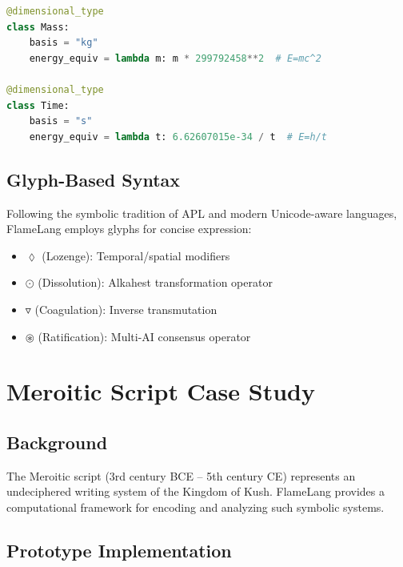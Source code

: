 \documentclass[11pt,a4paper]{article}
\begin{document}
\begin{lstlisting}[language=Python, caption=Dimensional Type Declaration]
@dimensional_type
class Mass:
    basis = "kg"
    energy_equiv = lambda m: m * 299792458**2  # E=mc^2

@dimensional_type  
class Time:
    basis = "s"
    energy_equiv = lambda t: 6.62607015e-34 / t  # E=h/t
\end{lstlisting}

\subsection{Glyph-Based Syntax}

Following the symbolic tradition of APL and modern Unicode-aware languages, FlameLang employs glyphs for concise expression:

\begin{itemize}
\item $\lozenge$ (Lozenge): Temporal/spatial modifiers
\item $\odot$ (Dissolution): Alkahest transformation operator
\item $\triangledown$ (Coagulation): Inverse transmutation
\item $\circledast$ (Ratification): Multi-AI consensus operator
\end{itemize}

\section{Meroitic Script Case Study}

\subsection{Background}

The Meroitic script (3rd century BCE – 5th century CE) represents an undeciphered writing system of the Kingdom of Kush. FlameLang provides a computational framework for encoding and analyzing such symbolic systems.

\subsection{Prototype Implementation}
\end{document}
